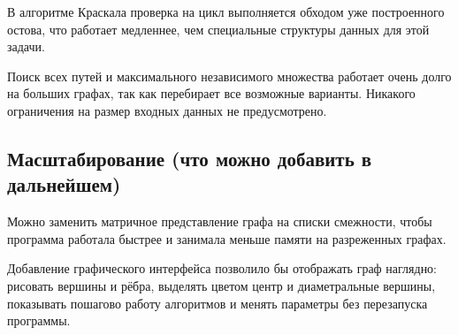 В алгоритме Краскала проверка на цикл выполняется обходом уже построенного
остова, что работает медленнее, чем специальные структуры данных для
этой задачи.

Поиск всех путей и максимального независимого множества работает очень
долго на больших графах, так как перебирает все возможные варианты.
Никакого ограничения на размер входных данных не предусмотрено.

\subsection*{Масштабирование (что можно добавить в дальнейшем)}

Можно заменить матричное представление графа на списки смежности,
чтобы программа работала быстрее и занимала меньше памяти на разреженных
графах.

Добавление графического интерфейса позволило бы отображать граф наглядно:
рисовать вершины и рёбра, выделять цветом центр и диаметральные вершины,
показывать пошагово работу алгоритмов и менять параметры без перезапуска
программы.
